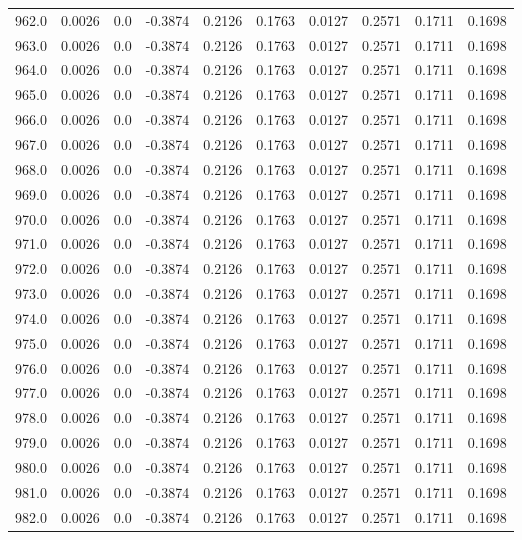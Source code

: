 \begin{longtable}{lrrrrrrrrr}
962.0 & 0.0026 & 0.0 & -0.3874 & 0.2126 & 0.1763 & 0.0127 & 0.2571 & 0.1711 & 0.1698 \\
963.0 & 0.0026 & 0.0 & -0.3874 & 0.2126 & 0.1763 & 0.0127 & 0.2571 & 0.1711 & 0.1698 \\
964.0 & 0.0026 & 0.0 & -0.3874 & 0.2126 & 0.1763 & 0.0127 & 0.2571 & 0.1711 & 0.1698 \\
965.0 & 0.0026 & 0.0 & -0.3874 & 0.2126 & 0.1763 & 0.0127 & 0.2571 & 0.1711 & 0.1698 \\
966.0 & 0.0026 & 0.0 & -0.3874 & 0.2126 & 0.1763 & 0.0127 & 0.2571 & 0.1711 & 0.1698 \\
967.0 & 0.0026 & 0.0 & -0.3874 & 0.2126 & 0.1763 & 0.0127 & 0.2571 & 0.1711 & 0.1698 \\
968.0 & 0.0026 & 0.0 & -0.3874 & 0.2126 & 0.1763 & 0.0127 & 0.2571 & 0.1711 & 0.1698 \\
969.0 & 0.0026 & 0.0 & -0.3874 & 0.2126 & 0.1763 & 0.0127 & 0.2571 & 0.1711 & 0.1698 \\
970.0 & 0.0026 & 0.0 & -0.3874 & 0.2126 & 0.1763 & 0.0127 & 0.2571 & 0.1711 & 0.1698 \\
971.0 & 0.0026 & 0.0 & -0.3874 & 0.2126 & 0.1763 & 0.0127 & 0.2571 & 0.1711 & 0.1698 \\
972.0 & 0.0026 & 0.0 & -0.3874 & 0.2126 & 0.1763 & 0.0127 & 0.2571 & 0.1711 & 0.1698 \\
973.0 & 0.0026 & 0.0 & -0.3874 & 0.2126 & 0.1763 & 0.0127 & 0.2571 & 0.1711 & 0.1698 \\
974.0 & 0.0026 & 0.0 & -0.3874 & 0.2126 & 0.1763 & 0.0127 & 0.2571 & 0.1711 & 0.1698 \\
975.0 & 0.0026 & 0.0 & -0.3874 & 0.2126 & 0.1763 & 0.0127 & 0.2571 & 0.1711 & 0.1698 \\
976.0 & 0.0026 & 0.0 & -0.3874 & 0.2126 & 0.1763 & 0.0127 & 0.2571 & 0.1711 & 0.1698 \\
977.0 & 0.0026 & 0.0 & -0.3874 & 0.2126 & 0.1763 & 0.0127 & 0.2571 & 0.1711 & 0.1698 \\
978.0 & 0.0026 & 0.0 & -0.3874 & 0.2126 & 0.1763 & 0.0127 & 0.2571 & 0.1711 & 0.1698 \\
979.0 & 0.0026 & 0.0 & -0.3874 & 0.2126 & 0.1763 & 0.0127 & 0.2571 & 0.1711 & 0.1698 \\
980.0 & 0.0026 & 0.0 & -0.3874 & 0.2126 & 0.1763 & 0.0127 & 0.2571 & 0.1711 & 0.1698 \\
981.0 & 0.0026 & 0.0 & -0.3874 & 0.2126 & 0.1763 & 0.0127 & 0.2571 & 0.1711 & 0.1698 \\
982.0 & 0.0026 & 0.0 & -0.3874 & 0.2126 & 0.1763 & 0.0127 & 0.2571 & 0.1711 & 0.1698 \\

\end{longtable}
